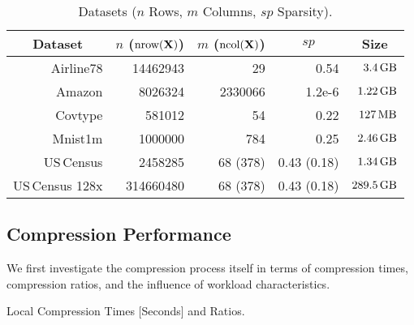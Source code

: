 \begin{table}[!t]
	\centering \setlength\tabcolsep{15.2pt}
	\caption{\label{tab:data}Datasets {\normalfont($n$ Rows, $m$ Columns, $sp$ Sparsity)}.}
	\vspace{-0.4cm}
	\begin{tabular}{rrrrr}
		\toprule
		\multicolumn{1}{c}{\textbf{Dataset}} & $n$ ($\text{nrow}(\mathbf{X})$) & $m$ ($\text{ncol}(\mathbf{X})$) & \multicolumn{1}{c}{$sp$} & \multicolumn{1}{c}{Size} \\
		\midrule
		Airline78 \cite{airline}             & \num{14462943}               & 29                           & 0.54                     & $3.4\gb$                 \\ %
		Amazon \cite{amazon,HeM16}           & \num{8026324}                & \num{2330066}                & 1.2e-6                   & $1.22\gb$                \\ %
		Covtype \cite{uci}                   & \num{581012}                 & 54                           & 0.22                     & $127\mb$                 \\ %
		Mnist1m \cite{infimnist}             & \num{1000000}                & 784                          & 0.25                     & $2.46\gb$                \\ %
		US\,Census \cite{uci}                & \num{2458285}                & 68 (378)                     & 0.43 (0.18)              & $1.34\gb$                \\ %
		US\,Census 128x                      & \num{314660480}              & 68 (378)                     & 0.43 (0.18)              & $289.5\gb$               \\ %
		\bottomrule
	\end{tabular}
\end{table}

\subsection{Compression Performance}

We first investigate the compression process itself in terms of compression times, compression ratios, and the influence of workload characteristics.

\begin{table} [!t] \setlength\tabcolsep{11.7pt}
  \vspace{-0.4cm}
	\caption{\label{tab:compressionTimes} Local Compression Times [Seconds] and Ratios.}
	\vspace{-0.4cm}
	

\end{table}

